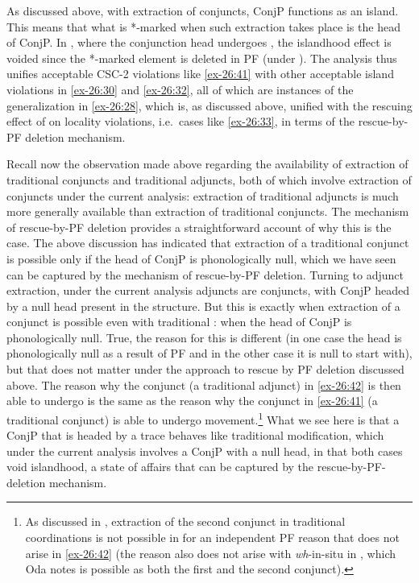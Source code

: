 \documentclass[output=paper]{langsci/langscibook}
\begin{document}
As discussed above, with extraction of conjuncts, ConjP functions as an island.
This means that what is *-marked when such extraction takes place is the head
of ConjP. In , where the conjunction head undergoes , the
islandhood effect is voided since the *-marked element is deleted in \gls{PF} (under
). The analysis thus unifies acceptable CSC-2 violations like \eqref{ex-26:41}
with other acceptable island violations in \eqref{ex-26:30} and \eqref{ex-26:32}, all of which are
instances of the generalization in \eqref{ex-26:28}, which is, as discussed above, unified
with the rescuing effect of  on locality violations, i.e.\ cases like
\eqref{ex-26:33}, in terms of the rescue-by-\gls{PF} deletion mechanism.

Recall now the observation made above regarding the availability of extraction
of traditional conjuncts and traditional adjuncts, both of which involve
extraction of conjuncts under the current analysis: extraction of traditional
adjuncts is much more generally available than extraction of traditional
conjuncts. The mechanism of rescue-by-\gls{PF} deletion provides a straightforward
account of why this is the case. The above discussion has indicated that
extraction of a traditional conjunct is possible only if the head of ConjP is
phonologically null, which we have seen can be captured by the mechanism of
rescue-by-PF deletion. Turning to adjunct extraction, under the current
analysis adjuncts are conjuncts, with ConjP headed by a null head present in
the structure. But this is exactly when extraction of a conjunct is possible
even with traditional : when the head of ConjP is phonologically
null. True, the reason for this is different (in one case the head is
phonologically null as a result of \gls{PF}  and in the other case it is
null to start with), but that does not matter under the approach to rescue by
\gls{PF} deletion discussed above. The reason why the conjunct (a traditional
adjunct) in \eqref{ex-26:42} is then able to undergo  is the same as the reason why
the conjunct in \eqref{ex-26:41} (a traditional conjunct) is able to undergo
movement.\footnote{As discussed in \textcite{Oda:2017}, extraction of the
    second conjunct in traditional coordinations is not possible in 
for an independent \gls{PF} reason that does not arise in \eqref{ex-26:42} (the reason also does
not arise with \emph{wh}-in-situ in , which Oda notes is possible as
both the first and the second conjunct).} What we see here is that
a ConjP that is headed by a trace behaves like traditional 
modification, which under the current analysis involves a ConjP with a null
head, in that both cases void islandhood, a state of affairs that can be
captured by the rescue-by-PF-deletion mechanism.
\end{document}
